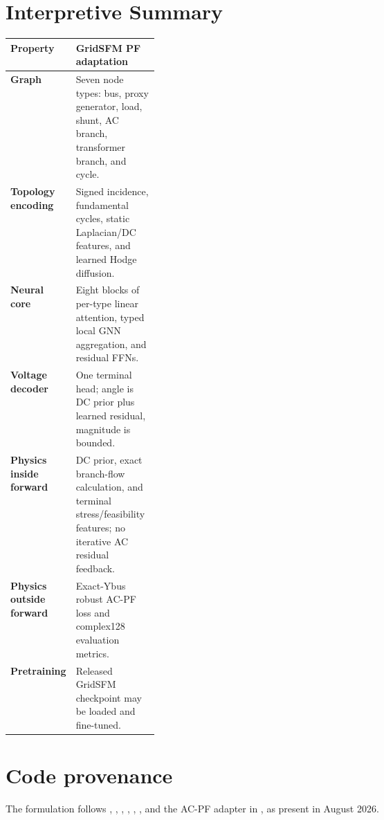 \documentclass[10pt]{article}
\begin{document}
\section{Interpretive Summary}
\begin{tabularx}{\linewidth}{>{\bfseries}p{0.25\linewidth}X}
\toprule
Property & GridSFM PF adaptation \\
\midrule
Graph & Seven node types: bus, proxy generator, load, shunt, AC branch, transformer branch, and cycle.\\
Topology encoding & Signed incidence, fundamental cycles, static Laplacian/DC features, and learned Hodge diffusion.\\
Neural core & Eight blocks of per-type linear attention, typed local GNN aggregation, and residual FFNs.\\
Voltage decoder & One terminal head; angle is DC prior plus learned residual, magnitude is bounded.\\
Physics inside forward & DC prior, exact branch-flow calculation, and terminal stress/feasibility features; no iterative AC residual feedback.\\
Physics outside forward & Exact-Ybus robust AC-PF loss and complex128 evaluation metrics.\\
Pretraining & Released GridSFM checkpoint may be loaded and fine-tuned.\\
\bottomrule
\end{tabularx}

\section*{Code provenance}
The formulation follows , ,
, ,
, , and the AC-PF
adapter in , as present in August 2026.
\end{document}
